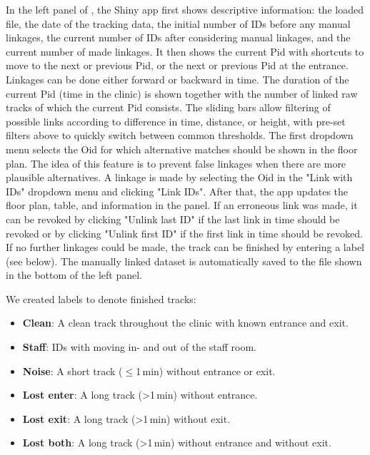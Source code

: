 \documentclass[fleqn,11pt]{wlscirep_supp}
\begin{document}
In the left panel of , the Shiny app first shows descriptive information: the loaded file, the date of the tracking data, the initial number of IDs before any manual linkages, the current number of IDs after considering manual linkages, and the current number of made linkages. It then shows the current Pid with shortcuts to move to the next or previous Pid, or the next or previous Pid at the entrance. Linkages can be done either forward or backward in time. The duration of the current Pid (time in the clinic) is shown together with the number of linked raw tracks of which the current Pid consists. The sliding bars allow filtering of possible links according to difference in time, distance, or height, with pre-set filters above to quickly switch between common thresholds. The first dropdown menu selects the Oid for which alternative matches should be shown in the floor plan. The idea of this feature is to prevent false linkages when there are more plausible alternatives. A linkage is made by selecting the Oid in the "Link with IDs" dropdown menu and clicking "Link IDs". After that, the app updates the floor plan, table, and information in the panel. If an erroneous link was made, it can be revoked by clicking "Unlink last ID" if the last link in time should be revoked or by clicking "Unlink first ID" if the first link in time should be revoked. If no further linkages could be made, the track can be finished by entering a label (see below). The manually linked dataset is automatically saved to the file shown in the bottom of the left panel.

We created labels to denote finished tracks: 
\begin{itemize}
    \item \textbf{Clean}: A clean track throughout the clinic with known entrance and exit.
    \item \textbf{Staff}: IDs with moving in- and out of the staff room.
    \item \textbf{Noise}: A short track ($\leq$1\,min) without entrance or exit.
    \item \textbf{Lost enter}: A long track (>1\,min) without entrance.
    \item \textbf{Lost exit}: A long track (>1\,min) without exit.
    \item \textbf{Lost both}: A long track (>1\,min) without entrance and without exit.
\end{itemize}
\end{document}
